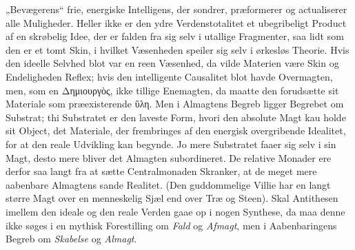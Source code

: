 \documentclass[12pt]{book}
\begin{document}
%
%
„Bevægerens“ frie, energiske Intelligens, der sondrer, præformerer og actualiserer alle
Muligheder. Heller ikke er den ydre Verdenstotalitet et ubegribeligt Product af en
skrøbelig Idee, der er falden fra sig selv i utallige Fragmenter, saa lidt som den er et
tomt Skin, i hvilket Væsenheden speiler sig selv i ørkesløs Theorie. Hvis den ideelle
Selvhed blot var en reen Væsenhed, da vilde Materien være Skin og Endeligheden Reflex;
hvis den intelligente Causalitet blot havde Overmagten, men, som en Δημιουργὸς, ikke
tillige Enemagten, da maatte den forudsætte sit Materiale som præexisterende ὕλη. Men i
Almagtens Begreb ligger Begrebet om Substrat; thi Substratet er den laveste Form, hvori
den absolute Magt kau holde sit Object, det Materiale, der frembringes af den energisk
overgribende Idealitet, for at den reale Udvikling kan begynde. Jo mere Substratet faaer
sig selv i sin Magt, desto mere bliver det Almagten subordineret. De relative Monader ere
derfor saa langt fra at sætte Centralmonaden Skranker, at de meget mere aabenbare
Almagtens sande Realitet. (Den guddommelige Villie har en langt større Magt over en
menneskelig Sjæl end over Træ og Steen). Skal Antithesen imellem den ideale og den reale
Verden gaae op i nogen Synthese, da maa denne ikke søges i en mythisk Forestilling om
\emph{Fald} og \emph{Afmagt}, men i Aabenbaringens Begreb om \emph{Skabelse} og
\emph{Almagt}.
\end{document}
